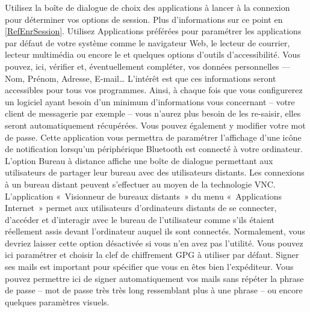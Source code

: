 Utilisez la boîte de dialogue de choix des applications à lancer à la connexion pour déterminer vos options de session. Plus d'informations sur ce point en \ref{RefEnrSession}.
Utilisez Applications préférées pour paramétrer les applications par défaut de votre système comme le navigateur Web, le lecteur de courrier, lecteur multimédia ou encore le  et quelques options d'outils d'accessibilité.
Vous pouvez, ici, vérifier et, éventuellement compléter, vos données personnelles --- Nom, Prénom, Adresse, E-mail\ldots{} L'intérêt est que ces informations seront accessibles pour tous vos programmes. Ainsi, à chaque fois que vous configurerez un logiciel ayant besoin d'un minimum d'informations vous concernant -- votre client de messagerie par exemple -- vous n'aurez plus besoin de les re-saisir, elles seront automatiquement récupérées.  Vous pouvez également y modifier votre mot de passe.
Cette application vous permettra de paramétrer l'affichage d'une icône de notification lorsqu'un périphérique Bluetooth est connecté à votre ordinateur.
L'option Bureau à distance affiche une boîte de dialogue permettant aux utilisateurs de partager leur bureau avec des utilisateurs distants. Les connexions à un bureau distant peuvent s'effectuer au moyen de la technologie VNC. L'application «~Visionneur de bureaux distants~» du menu «~Applications \FlecheDroite Internet~» permet aux utilisateurs d'ordinateurs distants de se connecter, d'accéder et d'interagir avec le bureau de l'utilisateur comme s'ils étaient réellement assis devant l'ordinateur auquel ils sont connectés. Normalement, vous devriez laisser cette option désactivée si vous n'en avez pas l'utilité.
Vous pouvez ici paramétrer et choisir la clef de chiffrement GPG à utiliser par défaut. Signer ses mails est important pour spécifier que vous en êtes bien l'expéditeur. Vous pouvez permettre ici de signer automatiquement vos mails sans répéter la phrase de passe -- mot de passe très très long ressemblant plus à une phrase -- ou encore quelques paramètres visuels.
